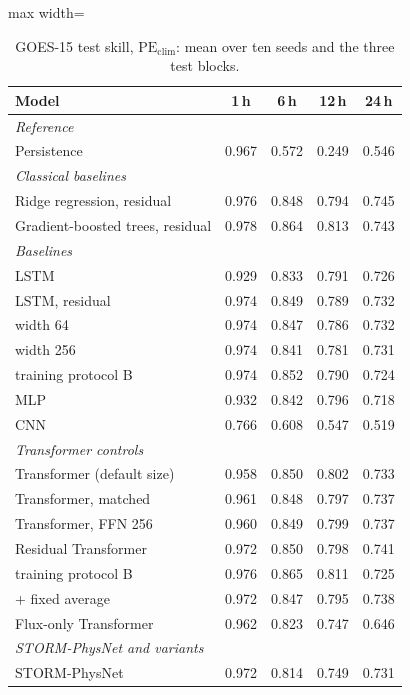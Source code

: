 \begin{table}[!t]
\centering
\caption{GOES-15 test skill, $\mathrm{PE}_\mathrm{clim}$: mean over ten seeds and the three test blocks.}
\label{tab:main}
\footnotesize
\setlength{\tabcolsep}{4pt}
\begin{adjustbox}{max width=\linewidth}
\begin{tabular}{lcccc}
\toprule
Model & 1\,h & 6\,h & 12\,h & 24\,h \\
\midrule
\multicolumn{5}{l}{\textit{Reference}} \\
Persistence & 0.967 & 0.572 & 0.249 & 0.546 \\
\multicolumn{5}{l}{\textit{Classical baselines}} \\
Ridge regression, residual & 0.976 & 0.848 & 0.794 & 0.745 \\
Gradient-boosted trees, residual & 0.978 & 0.864 & 0.813 & 0.743 \\
\multicolumn{5}{l}{\textit{Baselines}} \\
LSTM & 0.929 & 0.833 & 0.791 & 0.726 \\
LSTM, residual & 0.974 & 0.849 & 0.789 & 0.732 \\
\quad width 64 & 0.974 & 0.847 & 0.786 & 0.732 \\
\quad width 256 & 0.974 & 0.841 & 0.781 & 0.731 \\
\quad training protocol B & 0.974 & 0.852 & 0.790 & 0.724 \\
MLP & 0.932 & 0.842 & 0.796 & 0.718 \\
CNN & 0.766 & 0.608 & 0.547 & 0.519 \\
\multicolumn{5}{l}{\textit{Transformer controls}} \\
Transformer (default size) & 0.958 & 0.850 & 0.802 & 0.733 \\
Transformer, matched & 0.961 & 0.848 & 0.797 & 0.737 \\
Transformer, FFN 256 & 0.960 & 0.849 & 0.799 & 0.737 \\
Residual Transformer & 0.972 & 0.850 & 0.798 & 0.741 \\
\quad training protocol B & 0.976 & 0.865 & 0.811 & 0.725 \\
\quad + fixed average & 0.972 & 0.847 & 0.795 & 0.738 \\
Flux-only Transformer & 0.962 & 0.823 & 0.747 & 0.646 \\
\multicolumn{5}{l}{\textit{STORM-PhysNet and variants}} \\
STORM-PhysNet & 0.972 & 0.814 & 0.749 & 0.731 \\

\end{tabular}
\end{adjustbox}
\end{table}
